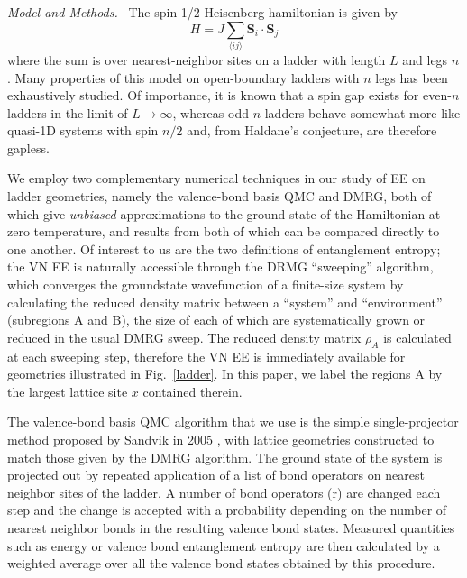 \documentclass[prl,aps,twocolumn,floatfix,amsmath,amssymb,superscriptaddress,tightenlines]{revtex4}
\begin{document}
{\it Model and Methods.}-- The spin 1/2 Heisenberg hamiltonian is given by
\begin{equation}
H = J \sum_{\langle i j \rangle} {\mathbf S}_i \cdot {\mathbf S}_j \label{ham}
\end{equation}
where the sum is over nearest-neighbor sites on a ladder with length $L$ and legs $n$.  Many properties of this model on open-boundary ladders with $n$ legs has been exhaustively studied.  Of importance, it is known that a spin gap exists for even-$n$ ladders in the limit of $L\rightarrow \infty$, whereas odd-$n$ ladders behave somewhat more like quasi-1D  systems with spin $n/2$ and, from Haldane's conjecture, are therefore gapless.  

We employ two complementary numerical techniques in our study of EE on ladder geometries, namely the valence-bond basis QMC and DMRG, both of which give {\it unbiased} approximations to the ground state of the Hamiltonian at zero temperature, and results from both of which can be compared directly to one another.  Of interest to us are the two definitions of entanglement entropy; the VN EE is naturally accessible through the DRMG ``sweeping'' algorithm, which converges the groundstate wavefunction of a finite-size system by calculating the reduced density matrix between a ``system'' and ``environment'' (subregions A and B), the size of each of which are systematically grown or reduced in the usual DMRG sweep.  The reduced density matrix $\rho_A$ is calculated at each sweeping step, therefore the VN EE is immediately available for geometries illustrated in Fig.~\ref{ladder}.  In this paper, we label the regions A by the largest lattice site $x$ contained therein.

The valence-bond basis QMC algorithm that we use is the simple single-projector method proposed by Sandvik in 2005 \cite{Sandvik}, with lattice geometries constructed to match those given by the DMRG algorithm.  The ground state of the system is projected out by repeated application of a list of bond operators on nearest neighbor sites of the ladder.  A number of bond operators (r) are changed each step and the change is accepted with a probability depending on the number of nearest neighbor bonds in the resulting valence bond states.  Measured quantities such as energy or valence bond entanglement entropy are then calculated by a weighted average over all the valence bond states obtained by this procedure.
\end{document}
